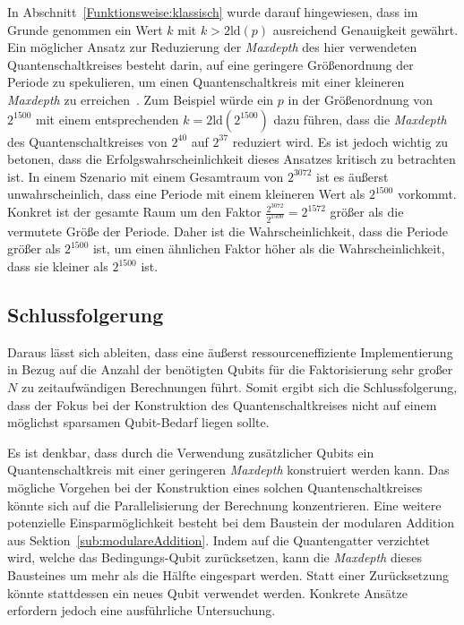In Abschnitt~\ref{Funktionsweise:klassisch} wurde darauf hingewiesen, 
dass im Grunde genommen ein Wert \(k\) mit \(k > 2\text{ld}(p)\) ausreichend Genauigkeit gewährt.
Ein möglicher Ansatz zur Reduzierung der \textit{Maxdepth} des hier verwendeten Quantenschaltkreises besteht darin, 
auf eine geringere Größenordnung der Periode zu spekulieren, 
um einen Quantenschaltkreis mit einer kleineren \textit{Maxdepth} zu erreichen~\cite{Shor_1997}. 
Zum Beispiel würde ein \(p\) in der Größenordnung von \(2^{1500}\) mit einem entsprechenden \(k = 2\text{ld}(2^{1500})\) dazu führen, 
dass die \textit{Maxdepth} des Quantenschaltkreises von \(2^{40}\) auf \(2^{37}\) reduziert wird. 
Es ist jedoch wichtig zu betonen, dass die Erfolgswahrscheinlichkeit dieses Ansatzes kritisch zu betrachten ist. 
In einem Szenario mit einem Gesamtraum von \(2^{3072}\) ist es äußerst unwahrscheinlich, 
dass eine Periode mit einem kleineren Wert als \(2^{1500}\) vorkommt.
Konkret ist der gesamte Raum um den Faktor \(\frac{2^{3072}}{2^{1500}} = 2^{1572}\) größer als die vermutete Größe der Periode. 
Daher ist die Wahrscheinlichkeit, dass die Periode größer als \(2^{1500}\) ist, 
um einen ähnlichen Faktor höher als die Wahrscheinlichkeit, 
dass sie kleiner als \(2^{1500}\) ist.

\subsection*{Schlussfolgerung}

Daraus lässt sich ableiten, 
dass eine äußerst ressourceneffiziente Implementierung in Bezug auf die Anzahl der benötigten Qubits 
für die Faktorisierung sehr großer \(N\) zu zeitaufwändigen Berechnungen führt. 
Somit ergibt sich die Schlussfolgerung, 
dass der Fokus bei der Konstruktion des Quantenschaltkreises nicht auf einem möglichst sparsamen Qubit-Bedarf liegen sollte.

Es ist denkbar, dass durch die Verwendung zusätzlicher Qubits ein Quantenschaltkreis mit einer geringeren \textit{Maxdepth} konstruiert werden kann. 
Das mögliche Vorgehen bei der Konstruktion eines solchen Quantenschaltkreises könnte sich auf die Parallelisierung der Berechnung konzentrieren. 
Eine weitere potenzielle Einsparmöglichkeit besteht bei dem Baustein der modularen Addition aus Sektion~\ref{sub:modulareAddition}. 
Indem auf die Quantengatter verzichtet wird, welche das Bedingungs-Qubit zurücksetzen, 
kann die \textit{Maxdepth} dieses Bausteines um mehr als die Hälfte eingespart werden. 
Statt einer Zurücksetzung könnte stattdessen ein neues Qubit verwendet werden. Konkrete Ansätze erfordern jedoch eine ausführliche Untersuchung.


